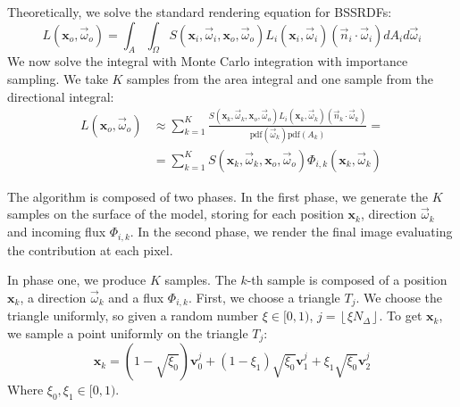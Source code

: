\documentclass[10pt,a4paper]{article}
\begin{document}
Theoretically, we solve the standard rendering equation for BSSRDFs:
\begin{equation*}
L(\mathbf{x}_o, \vec{\omega}_o) = \int_A \int_\Omega S(\mathbf{x}_i, \vec{\omega}_i, \mathbf{x}_o, \vec{\omega}_o) L_i(\mathbf{x}_i, \vec{\omega}_i) (\vec{n}_i \cdot \vec{\omega}_i) d A_i d \vec{\omega}_i 
\end{equation*}
We now solve the integral with Monte Carlo integration with importance sampling. We take $K$ samples from the area integral and one sample from the directional integral:
\begin{equation}
\label{eq:mc}
\begin{split}
L(\mathbf{x}_o, \vec{\omega}_o) &\approx \sum_{k = 1}^K \frac{S(\mathbf{x}_k, \vec{\omega}_k, \mathbf{x}_o, \vec{\omega}_o) L_i(\mathbf{x}_k, \vec{\omega}_k) (\vec{n}_k \cdot \vec{\omega}_k)}{\text{pdf}(\vec{\omega}_k) \text{pdf}(A_k)} = \\
&=  \sum_{k = 1}^K S(\mathbf{x}_k, \vec{\omega}_k, \mathbf{x}_o, \vec{\omega}_o) \Phi_{i,k}(\mathbf{x}_k, \vec{\omega}_k)
\end{split}
\end{equation}

The algorithm is composed of two phases. In the first phase, we generate the $K$ samples on the surface of the model, storing for each position $\mathbf{x}_k$, direction $\vec{\omega}_k$ and incoming flux $\Phi_{i,k}$. In the second phase, we render the final image evaluating the contribution at each pixel.

In phase one, we produce $K$ samples. The $k$-th  sample is composed of a position $\mathbf{x}_k$, a direction $\vec{\omega}_k$ and a flux $\Phi_{i,k}$. First, we choose a triangle $T_j$. We choose the triangle uniformly, so given a random number $\xi \in [0,1)$, $j = \left \lfloor{\xi N_\Delta}\right \rfloor$. To get $\mathbf{x}_k$, we sample a point uniformly on the triangle $T_j$:
$$
\mathbf{x}_k = (1 - \sqrt{\xi_0})\mathbf{v}^j_0 + (1 - {\xi_1})  \sqrt{\xi_0} \mathbf{v}^j_1 +  \xi_1\sqrt{\xi_0} \mathbf{v}^j_2
$$ 
Where $\xi_0, \xi_1 \in [0,1)$. 
\end{document}
